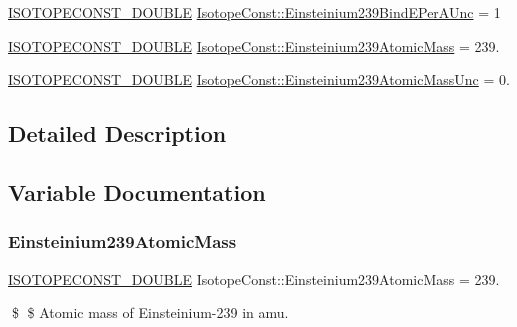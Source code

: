 \begin{DoxyCompactItemize}
\mbox{\hyperlink{group___isotope_const-_macros_ga8f45a7272ce02c0b4c65c44636ed719a}{I\+S\+O\+T\+O\+P\+E\+C\+O\+N\+S\+T\+\_\+\+D\+O\+U\+B\+LE}} \mbox{\hyperlink{group___isotope_const-_einsteinium-_es239_gaadae5dca4ce5465c06da6b4f16a56c13}{Isotope\+Const\+::\+Einsteinium239\+Bind\+E\+Per\+A\+Unc}} = 1
\item 
\mbox{\hyperlink{group___isotope_const-_macros_ga8f45a7272ce02c0b4c65c44636ed719a}{I\+S\+O\+T\+O\+P\+E\+C\+O\+N\+S\+T\+\_\+\+D\+O\+U\+B\+LE}} \mbox{\hyperlink{group___isotope_const-_einsteinium-_es239_gaafc670720d2833d8c8db04171d1a3baa}{Isotope\+Const\+::\+Einsteinium239\+Atomic\+Mass}} = 239.
\item 
\mbox{\hyperlink{group___isotope_const-_macros_ga8f45a7272ce02c0b4c65c44636ed719a}{I\+S\+O\+T\+O\+P\+E\+C\+O\+N\+S\+T\+\_\+\+D\+O\+U\+B\+LE}} \mbox{\hyperlink{group___isotope_const-_einsteinium-_es239_ga646e6847620ba011fa2fe64999282a61}{Isotope\+Const\+::\+Einsteinium239\+Atomic\+Mass\+Unc}} = 0.
\end{DoxyCompactItemize}


\subsection{Detailed Description}


\subsection{Variable Documentation}
\mbox{\label{group___isotope_const-_einsteinium-_es239_gaafc670720d2833d8c8db04171d1a3baa}} 
\subsubsection{\texorpdfstring{Einsteinium239\+Atomic\+Mass}{Einsteinium239AtomicMass}}
{\footnotesize\ttfamily \mbox{\hyperlink{group___isotope_const-_macros_ga8f45a7272ce02c0b4c65c44636ed719a}{I\+S\+O\+T\+O\+P\+E\+C\+O\+N\+S\+T\+\_\+\+D\+O\+U\+B\+LE}} Isotope\+Const\+::\+Einsteinium239\+Atomic\+Mass = 239.}

\$ \$ Atomic mass of Einsteinium-\/239 in amu. \mbox{\label{group___isotope_const-_einsteinium-_es239_ga646e6847620ba011fa2fe64999282a61}} 
